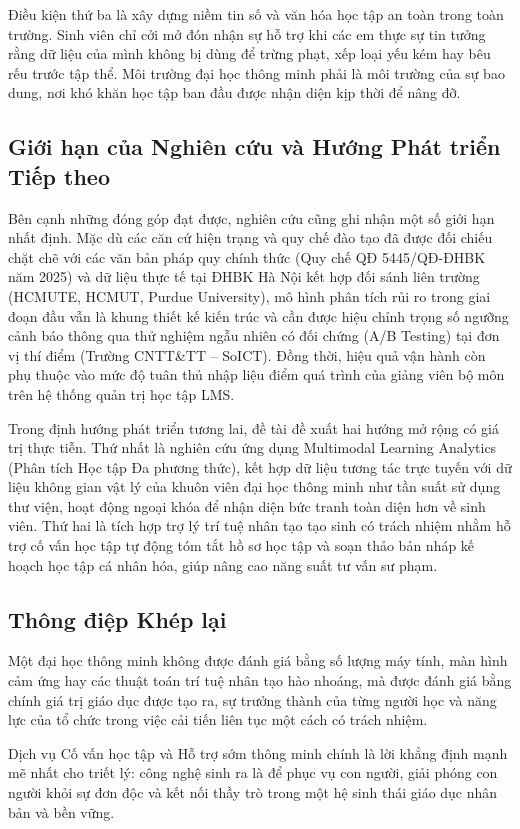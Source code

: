 Điều kiện thứ ba là xây dựng niềm tin số và văn hóa học tập an toàn trong toàn trường. Sinh viên chỉ cởi mở đón nhận sự hỗ trợ khi các em thực sự tin tưởng rằng dữ liệu của mình không bị dùng để trừng phạt, xếp loại yếu kém hay bêu rếu trước tập thể. Môi trường đại học thông minh phải là môi trường của sự bao dung, nơi khó khăn học tập ban đầu được nhận diện kịp thời để nâng đỡ.

\subsection{Giới hạn của Nghiên cứu và Hướng Phát triển Tiếp theo}
Bên cạnh những đóng góp đạt được, nghiên cứu cũng ghi nhận một số giới hạn nhất định. Mặc dù các căn cứ hiện trạng và quy chế đào tạo đã được đối chiếu chặt chẽ với các văn bản pháp quy chính thức (Quy chế QĐ 5445/QĐ-ĐHBK năm 2025) và dữ liệu thực tế tại ĐHBK Hà Nội kết hợp đối sánh liên trường (HCMUTE, HCMUT, Purdue University), mô hình phân tích rủi ro trong giai đoạn đầu vẫn là khung thiết kế kiến trúc và cần được hiệu chỉnh trọng số ngưỡng cảnh báo thông qua thử nghiệm ngẫu nhiên có đối chứng (A/B Testing) tại đơn vị thí điểm (Trường CNTT\&TT -- SoICT). Đồng thời, hiệu quả vận hành còn phụ thuộc vào mức độ tuân thủ nhập liệu điểm quá trình của giảng viên bộ môn trên hệ thống quản trị học tập LMS.

Trong định hướng phát triển tương lai, đề tài đề xuất hai hướng mở rộng có giá trị thực tiễn. Thứ nhất là nghiên cứu ứng dụng Multimodal Learning Analytics (Phân tích Học tập Đa phương thức), kết hợp dữ liệu tương tác trực tuyến với dữ liệu không gian vật lý của khuôn viên đại học thông minh như tần suất sử dụng thư viện, hoạt động ngoại khóa để nhận diện bức tranh toàn diện hơn về sinh viên. Thứ hai là tích hợp trợ lý trí tuệ nhân tạo tạo sinh có trách nhiệm nhằm hỗ trợ cố vấn học tập tự động tóm tắt hồ sơ học tập và soạn thảo bản nháp kế hoạch học tập cá nhân hóa, giúp nâng cao năng suất tư vấn sư phạm.

\subsection{Thông điệp Khép lại}
Một đại học thông minh không được đánh giá bằng số lượng máy tính, màn hình cảm ứng hay các thuật toán trí tuệ nhân tạo hào nhoáng, mà được đánh giá bằng chính giá trị giáo dục được tạo ra, sự trưởng thành của từng người học và năng lực của tổ chức trong việc cải tiến liên tục một cách có trách nhiệm. 

Dịch vụ Cố vấn học tập và Hỗ trợ sớm thông minh chính là lời khẳng định mạnh mẽ nhất cho triết lý: công nghệ sinh ra là để phục vụ con người, giải phóng con người khỏi sự đơn độc và kết nối thầy trò trong một hệ sinh thái giáo dục nhân bản và bền vững.
